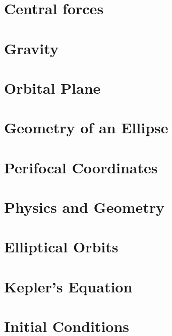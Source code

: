 \documentclass[a5paper,12pt]{book}
\begin{document}
\frontmatter


\tableofcontents
\listoffigures

\mainmatter
\clearpage
\chapter{Central forces}

\clearpage

\chapter{Gravity}

\clearpage

\chapter{Orbital Plane}

\clearpage

\chapter{Geometry of an Ellipse}

\clearpage

\chapter{Perifocal Coordinates}

\clearpage

\chapter{Physics and Geometry}

\clearpage

\chapter{Elliptical Orbits}
\clearpage

\chapter{Kepler's Equation}

\clearpage

\chapter{Initial Conditions}
\end{document}
